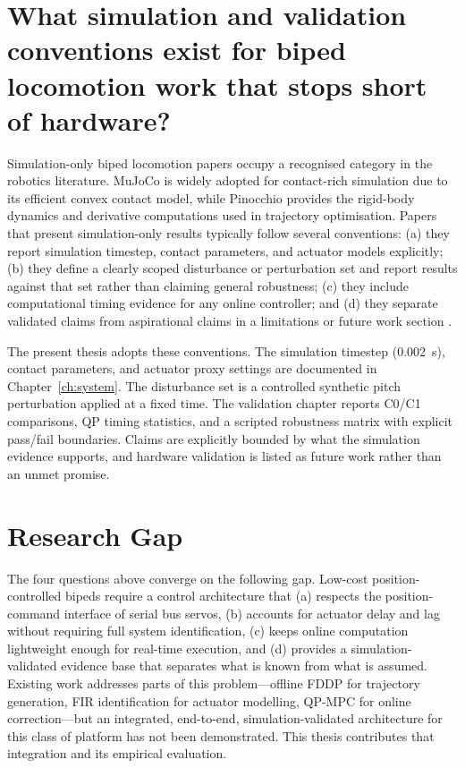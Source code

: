 \documentclass[12pt,a4paper]{report}
\begin{document}
\section{What simulation and validation conventions exist for biped locomotion work that stops short of hardware?}
 
Simulation-only biped locomotion papers occupy a recognised category in the robotics literature. MuJoCo \cite{todorov2012mujoco} is widely adopted for contact-rich simulation due to its efficient convex contact model, while Pinocchio \cite{carpentier2019pinocchio} provides the rigid-body dynamics and derivative computations used in trajectory optimisation. Papers that present simulation-only results typically follow several conventions: (a) they report simulation timestep, contact parameters, and actuator models explicitly; (b) they define a clearly scoped disturbance or perturbation set and report results against that set rather than claiming general robustness; (c) they include computational timing evidence for any online controller; and (d) they separate validated claims from aspirational claims in a limitations or future work section \cite{grandia2023_perception, kang2023_hexapod}.
 
The present thesis adopts these conventions. The simulation timestep (\SI{0.002}{\second}), contact parameters, and actuator proxy settings are documented in Chapter~\ref{ch:system}. The disturbance set is a controlled synthetic pitch perturbation applied at a fixed time. The validation chapter reports C0/C1 comparisons, QP timing statistics, and a scripted robustness matrix with explicit pass/fail boundaries. Claims are explicitly bounded by what the simulation evidence supports, and hardware validation is listed as future work rather than an unmet promise.
 
\section{Research Gap}
The four questions above converge on the following gap. Low-cost position-controlled bipeds require a control architecture that (a) respects the position-command interface of serial bus servos, (b) accounts for actuator delay and lag without requiring full system identification, (c) keeps online computation lightweight enough for real-time execution, and (d) provides a simulation-validated evidence base that separates what is known from what is assumed. Existing work addresses parts of this problem---offline FDDP for trajectory generation, FIR identification for actuator modelling, QP-MPC for online correction---but an integrated, end-to-end, simulation-validated architecture for this class of platform has not been demonstrated. This thesis contributes that integration and its empirical evaluation.
 
\end{document}
